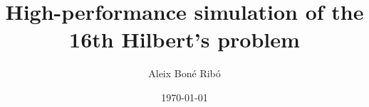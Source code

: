 



% 

\usepackage{fancyhdr}
\usepackage{pgfgantt}
\usepackage{pdflscape}
\usepackage{titlesec}

\usepackage{chngcntr}

\titleformat{\paragraph}[hang]{\normalfont\normalsize\bfseries}{\theparagraph}{1em}{}

\renewcommand\theadfont{\bfseries}

\title{High-performance simulation of the 16th Hilbert's problem}
\author{Aleix Bon\'e Rib\'o}
\date{\today}




    


